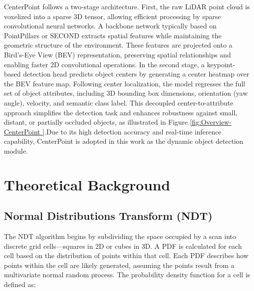 CenterPoint follows a two-stage architecture\cite{yin2021center}. First, the raw LiDAR point cloud is voxelized into a sparse 3D tensor, allowing efficient processing by sparse convolutional neural networks. A backbone network typically based on PointPillars \cite{lang2019pointpillars} or SECOND\cite{yan2018second} extracts spatial features while maintaining the geometric structure of the environment. These features are projected onto a Bird’s-Eye View (BEV) representation, preserving spatial relationships and enabling faster 2D convolutional operations. In the second stage, a keypoint-based detection head predicts object centers by generating a center heatmap over the BEV feature map. Following center localization, the model regresses the full set of object attributes, including 3D bounding box dimensions, orientation (yaw angle), velocity, and semantic class label. This decoupled center-to-attribute approach simplifies the detection task and enhances robustness against small, distant, or partially occluded objects, as illustrated in Figure \ref{fig:Overview-CenterPoint }.Due to its high detection accuracy and real-time inference capability, CenterPoint is adopted in this work as the dynamic object detection module.



\section{Theoretical Background }

\subsection{Normal Distributions Transform (NDT)}
\label{sec:Normal Distributions Transform}

The NDT algorithm begins by subdividing the space occupied by a scan into discrete grid cells---squares in 2D or cubes in 3D. A PDF is calculated for each cell based on the distribution of points within that cell. Each PDF describes how points within the cell are likely generated, assuming the points result from a multivariate normal random process. The probability density function for a cell is defined as:

